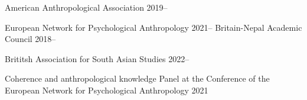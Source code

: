 


\begin{cvmemberships}
  \cvmembership
    {American Anthropological Association} %
    {2019--} %

  \cvmembership
    {European Network for Psychological Anthropology} %
    {2021--} %
  \cvmembership
    {Britain-Nepal Academic Council} %
    {2018--} %

  \cvmembership
    {Brititsh Association for South Asian Studies} %
    {2022--} %
\end{cvmemberships}


\begin{cvexperiences}

  \cvexperience
    {Coherence and anthropological knowledge} %
    {Panel at the Conference of the European Network for Psychological Anthropology} %
    {2021} %

\end{cvexperiences}
